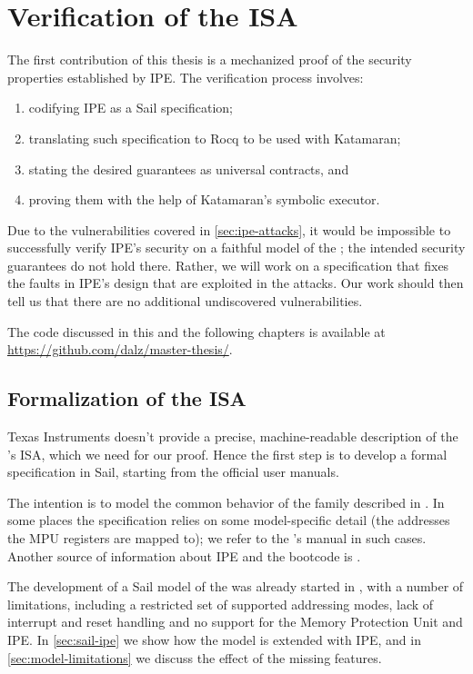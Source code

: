 \chapter{Verification of the \texorpdfstring{\msp}{MSP430} ISA}
\label{ch:contracts}

The first contribution of this thesis is a mechanized proof of the security properties established by IPE. The verification process involves:
\begin{enumerate}
\item codifying IPE as a Sail specification;
\item translating such specification to Rocq to be used with Katamaran;
\item stating the desired guarantees as universal contracts, and
\item proving them with the help of Katamaran's symbolic executor.
\end{enumerate}

Due to the vulnerabilities covered in \cref{sec:ipe-attacks}, it would be impossible to successfully verify IPE's security on a faithful model of the \msp; the intended security guarantees do not hold there. Rather, we will work on a specification that fixes the faults in IPE's design that are exploited in the attacks. Our work should then tell us that there are no additional undiscovered vulnerabilities.

The code discussed in this and the following chapters is available at \url{https://github.com/dalz/master-thesis/}.

\section{Formalization of the \texorpdfstring{\msp}{MSP430} ISA}

Texas Instruments doesn't provide a precise, machine-readable description of the \msp's ISA, which we need for our proof. Hence the first step is to develop a formal specification in Sail, starting from the official user manuals.

The intention is to model the common behavior of the family described in \cite{slau367p}. In some places the specification relies on some model-specific detail (\eg the addresses the MPU registers are mapped to); we refer to the \msp[FR5969]'s manual \cite{slas704g} in such cases. Another source of information about IPE and the bootcode is \cite{slaa685}.

The development of a Sail model of the \msp was already started in \cite{mspthesis}, with a number of limitations, including a restricted set of supported addressing modes, lack of interrupt and reset handling and no support for the Memory Protection Unit and IPE. In \cref{sec:sail-ipe} we show how the model is extended with IPE, and in \cref{sec:model-limitations} we discuss the effect of the missing features.

